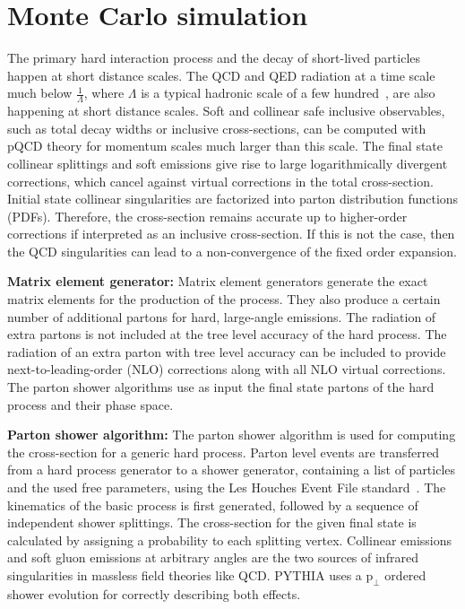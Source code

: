 \section{Monte Carlo simulation}

The primary hard interaction process and the decay of short-lived particles happen at short distance scales. The QCD and QED radiation at a time scale much below $\frac{1}{\Lambda}$, where $\Lambda$ is a typical hadronic scale of a few hundred~\MeV, are also happening at short distance scales. Soft and collinear safe inclusive observables, such as total decay widths or inclusive cross-sections, can be computed with pQCD theory for momentum scales much larger than this scale. The final state collinear splittings and soft emissions give rise to large logarithmically divergent corrections, which cancel against virtual corrections in the total cross-section. Initial state collinear singularities are factorized into parton distribution functions (PDFs). Therefore, the cross-section remains accurate up to higher-order corrections if interpreted as an inclusive cross-section. If this is not the case, then the QCD singularities can lead to a non-convergence of the fixed order expansion.

\textbf{Matrix element generator:} Matrix element generators generate the exact matrix elements for the production of the process. They also produce a certain number of additional partons for hard, large-angle emissions. The radiation of extra partons is not included at the tree level accuracy of the hard process. The radiation of an extra parton with tree level accuracy can be included to provide next-to-leading-order (NLO) corrections along with all NLO virtual corrections. The parton shower algorithms use as input the final state partons of the hard process and their phase space.

\textbf{Parton shower algorithm:} The parton shower algorithm is used for computing the cross-section for a generic hard process. Parton level events are transferred from a hard process generator to a shower generator, containing a list of particles and the used free parameters, using the Les Houches Event File standard~\cite{Alwall:2006yp}. The kinematics of the basic process is first generated, followed by a sequence of independent shower splittings. The cross-section for the given final state is calculated by assigning a probability to each splitting vertex. Collinear emissions and soft gluon emissions at arbitrary angles are the two sources of infrared singularities in massless field theories like QCD. PYTHIA uses a $\text{p}_{\perp}$ ordered shower evolution for correctly describing both effects.

